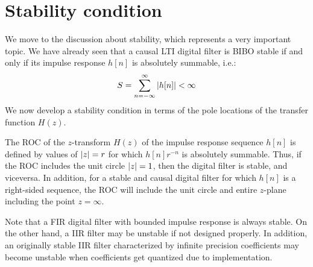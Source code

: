 \documentclass[../../main/main.tex]{subfiles}
\begin{document}

\section{Stability condition}
We move to the discussion about stability, which represents a very important topic. We have already seen that a causal LTI digital filter is BIBO stable if and only if its impulse response \( h[n] \) is absolutely summable, i.e.:
\begin{equation}
    S
    =
    \sum_{n=-\infty}^{\infty} \abs{h[n]}
    < \infty
    \label{eq:L17_S03_1}
\end{equation}
We now develop a stability condition in terms of the pole locations of the transfer function \( H(z) \).

The ROC of the \( z \)-transform \( H(z) \) of the impulse response sequence \( h[n] \) is defined by values of \( \abs{z} = r \) for which \( h[n]r^{-n} \) is absolutely summable. Thus, if the ROC includes the unit circle \( \abs{z} = 1 \), then the digital filter is stable, and viceversa. In addition, for a stable and causal digital filter for which \( h[n] \) is a right-sided sequence, the ROC will include the unit circle and entire \( z \)-plane including the point \( z = \infty \).

Note that a FIR digital filter with bounded impulse response is always stable. On the other hand, a IIR filter may be unstable if not designed properly.
In addition, an originally stable IIR filter characterized by infinite precision coefficients may become unstable when coefficients get quantized due to implementation.
\end{document}

